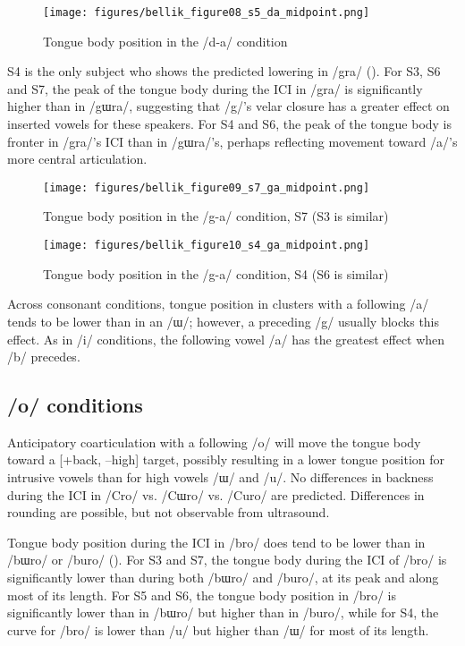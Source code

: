 \documentclass[output=paper,colorlinks,citecolor=brown]{langscibook}
\begin{document}
\begin{figure}
\caption{Tongue body position in the /d-a/ condition}
\texttt{[image: figures/bellik\_figure08\_s5\_da\_midpoint.png]}
\label{das5}
\end{figure}

S4 is the only subject who shows the predicted lowering in /gra/ (). For S3, S6 and S7, the peak of the tongue body during the ICI in /gra/ is significantly higher than in /gɯra/, suggesting that /g/’s velar closure has a greater effect on inserted vowels for these speakers. For S4 and S6, the peak of the tongue body is fronter in /gra/'s ICI than in /gɯra/'s, perhaps reflecting movement toward /a/’s more central articulation.

\begin{figure}
\caption{Tongue body position in the /g-a/ condition, S7 (S3 is similar)}
\texttt{[image: figures/bellik\_figure09\_s7\_ga\_midpoint.png]}
\label{gas7}
\end{figure}

\begin{figure}
\caption{Tongue body position in the /g-a/ condition, S4 (S6 is similar)}
\texttt{[image: figures/bellik\_figure10\_s4\_ga\_midpoint.png]}
\label{gas4}
\end{figure}
 


Across consonant conditions, tongue position in clusters with a following /a/ tends to be lower than in an /ɯ/; however, a preceding /g/ usually blocks this effect. As in /i/ conditions, the following vowel /a/ has the greatest effect when /b/ precedes.



\subsection{/o/ conditions}

Anticipatory coarticulation with a following /o/ will move the tongue body toward a [+back, –high] target, possibly resulting in a lower tongue position for intrusive vowels than for high vowels /ɯ/ and /u/. No differences in backness during the ICI in /Cro/ vs. /Cɯro/ vs. /Curo/ are predicted. Differences in rounding are possible, but not observable from ultrasound.

Tongue body position during the ICI in /bro/ does tend to be lower than in /bɯro/ or /buro/ (). For S3 and S7, the tongue body during the ICI of /bro/ is significantly lower than during both /bɯro/ and /buro/, at its peak and along most of its length. For S5 and S6, the tongue body position in /bro/ is significantly lower than in /bɯro/ but higher than in /buro/, while for S4, the curve for /bro/ is lower than /u/ but higher than /ɯ/ for most of its length.
\end{document}
